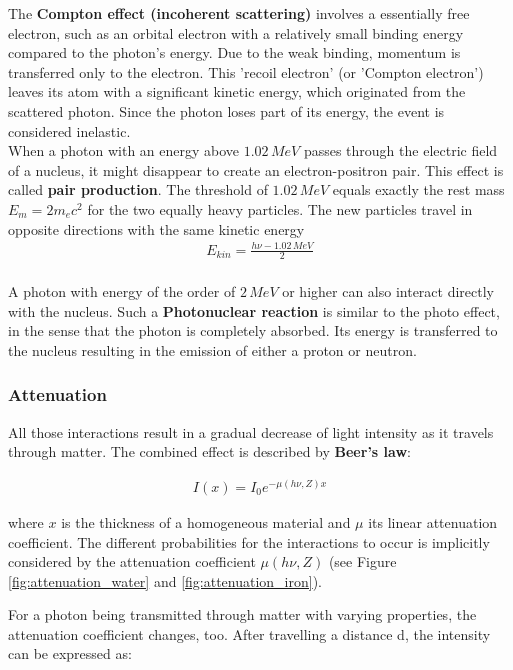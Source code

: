 The \textbf{Compton effect (incoherent scattering)} involves a essentially free electron, such as an orbital electron with a relatively small binding energy compared to the photon's energy.
Due to the weak binding, momentum is transferred only to the electron.
This 'recoil electron' (or 'Compton electron') leaves its atom with a significant kinetic energy, which originated from the scattered photon.
Since the photon loses part of its energy, the event is considered inelastic. \\

When a photon with an energy above $1.02 \, MeV$ passes through the electric field of a nucleus, it might disappear to create an electron-positron pair.
This effect is called \textbf{pair production}.
The threshold of $1.02 \, MeV$ equals exactly the rest mass $E_m = 2m_ec^2$ for the two equally heavy particles.
The new particles travel in opposite directions with the same kinetic energy
\begin{align}
 E_{kin} = \frac{h\nu - 1.02 \, MeV}{2}
\end{align} \\

A photon with energy of the order of $2 \, MeV$ or higher can also interact directly with the nucleus.
Such a \textbf{Photonuclear reaction} is similar to the photo effect, in the sense that the photon is completely absorbed.
Its energy is transferred to the nucleus resulting in the emission of either a proton or neutron. \\

\subsubsection{Attenuation}
All those interactions result in a gradual decrease of light intensity as it travels through matter.
The combined effect is described by \textbf{Beer's law}:

\begin{align}
I(x) = I_0 e^{-\mu(h\nu,Z)x}
\end{align}

where $x$ is the thickness of a homogeneous material and $\mu$ its linear attenuation coefficient.
The different probabilities for the interactions to occur is implicitly considered by the attenuation coefficient $\mu(h\nu,Z)$ (see Figure \ref{fig:attenuation_water} and \ref{fig:attenuation_iron}).

For a photon being transmitted through matter with varying properties, the attenuation coefficient changes, too.
After travelling a distance d, the intensity can be expressed as:


